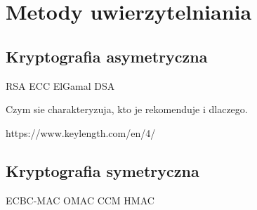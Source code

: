\chapter{Metody uwierzytelniania}
\label{cha:metodyUwierzytelniania}

\section{Kryptografia asymetryczna}
\label{sec:kryptoAsym}

RSA
ECC
ElGamal
DSA

Czym sie charakteryzuja, kto je rekomenduje i dlaczego.

https://www.keylength.com/en/4/

\section{Kryptografia symetryczna}
\label{sec:kryptoSym}

ECBC-MAC
OMAC
CCM
HMAC
